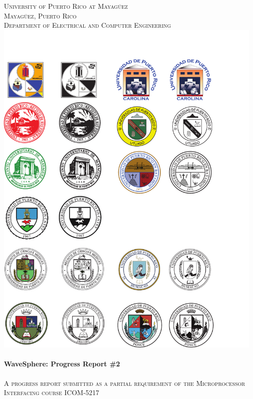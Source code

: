 \begin{titlepage}

\begin{center}


    

\textsc{\large University of Puerto Rico at Mayag\"{u}ez}\\[0.5cm]
\textsc{\large Mayag\"{u}ez, Puerto Rico}\\[0.5cm]
\textsc{\normalsize Department of Electrical and Computer Engineering}\\[1.5cm]
\includegraphics[scale=1.25]{res/logo_rum}\\[1cm]


\HRule \\[0.5cm]
{ \huge \bfseries WaveSphere: Progress Report \#2}\\[0.2cm]
\HRule \\[0.5cm]
\textsc{A progress report submitted as a partial requirement of the Microprocessor Interfacing course ICOM-5217}\\[0.5cm]


\end{center}
\end{titlepage}

